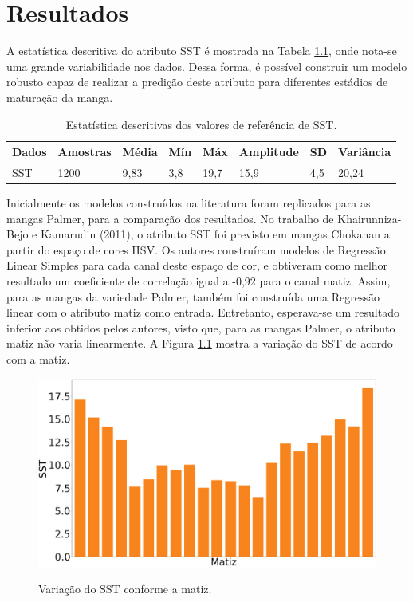 \chapter{Resultados} \label{ch:RD}

A estatística descritiva do atributo SST é mostrada na Tabela \ref{tbl:sst_stat}, onde nota-se uma grande variabilidade nos dados. Dessa forma, é possível construir um modelo robusto capaz de realizar a predição deste atributo para diferentes estádios de maturação da manga.

\begin{table}[H]
\centering
\caption{Estatística descritivas dos valores de referência de SST.} \label{tbl:sst_stat}
\begin{tabular}{llllllll}
\hline
Dados     & Amostras & M\'edia & M\'in & M\'ax & Amplitude & SD & Vari\^ancia   \\
\hline
SST     & 1200 & 9,83 &  3,8 &  19,7 &  15,9 &  4,5 &  20,24 \\
\hline
\end{tabular}
\end{table}

Inicialmente os modelos construídos na literatura foram replicados para as mangas Palmer, para a comparação dos resultados. No trabalho de Khairunniza-Bejo e Kamarudin (2011), o atributo SST foi previsto em mangas Chokanan a partir do espaço de cores HSV. Os autores construíram modelos de Regressão Linear Simples para cada canal deste espaço de cor, e obtiveram como melhor resultado um coeficiente de correlação igual a -0,92 para o canal matiz. Assim, para as mangas da variedade Palmer, também foi construída uma Regressão linear com o atributo matiz como entrada. Entretanto, esperava-se um resultado inferior aos obtidos pelos autores, visto que, para as mangas Palmer, o atributo matiz não varia linearmente. A Figura \ref{fig:hue_sst} mostra a variação do SST de acordo com a matiz. 

\begin{figure}[H]
\centering
	\caption{Variação do SST conforme a matiz.}
	\includegraphics[scale=0.18]{img/hue_sst_palmer.png}
	\label{fig:hue_sst}
\end{figure}

